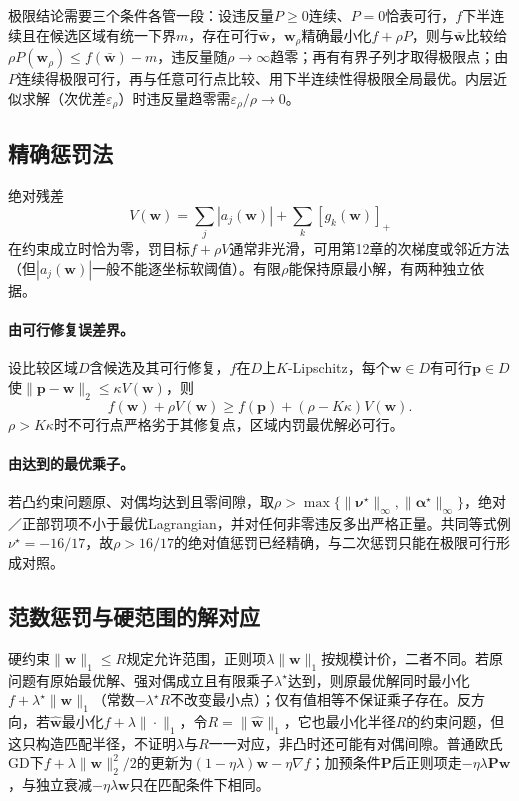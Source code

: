 极限结论需要三个条件各管一段：设违反量$P\geq0$连续、$P=0$恰表可行，$f$下半连续且在候选区域有统一下界$m$，存在可行$\bar{\bm w}$，$\bm w_\rho$精确最小化$f+\rho P$，则与$\bar{\bm w}$比较给$\rho P(\bm w_\rho)\leq f(\bar{\bm w})-m$，违反量随$\rho\to\infty$趋零；再有有界子列才取得极限点；由$P$连续得极限可行，再与任意可行点比较、用下半连续性得极限全局最优。内层近似求解（次优差$\varepsilon_\rho$）时违反量趋零需$\varepsilon_\rho/\rho\to0$。

\subsection{精确惩罚法}

绝对残差
\begin{equation}
 V(\bm w)=\sum_j|a_j(\bm w)|+\sum_k[g_k(\bm w)]_+
 \label{eq:opt-exact-penalty}
\end{equation}
在约束成立时恰为零，罚目标$f+\rho V$通常非光滑，可用第12章的次梯度或邻近方法（但$|a_j(\bm w)|$一般不能逐坐标软阈值）。有限$\rho$能保持原最小解，有两种独立依据。

\paragraph{由可行修复误差界。}
设比较区域$D$含候选及其可行修复，$f$在$D$上$K$-Lipschitz，每个$\bm w\in D$有可行$\bm p\in D$使$\|\bm p-\bm w\|_2\leq\kappa V(\bm w)$，则
\[
 f(\bm w)+\rho V(\bm w)
 \geq f(\bm p)+(\rho-K\kappa)V(\bm w).
\]
$\rho>K\kappa$时不可行点严格劣于其修复点，区域内罚最优解必可行。

\paragraph{由达到的最优乘子。}
若凸约束问题原、对偶均达到且零间隙，取$\rho>\max\{\|\bm\nu^\star\|_\infty,\|\bm\alpha^\star\|_\infty\}$，绝对／正部罚项不小于最优Lagrangian，并对任何非零违反多出严格正量。共同等式例$\nu^\star=-16/17$，故$\rho>16/17$的绝对值惩罚已经精确，与二次惩罚只能在极限可行形成对照。

\subsection{范数惩罚与硬范围的解对应}

硬约束$\|\bm w\|_1\leq R$规定允许范围，正则项$\lambda\|\bm w\|_1$按规模计价，二者不同。若原问题有原始最优解、强对偶成立且有限乘子$\lambda^\star$达到，则原最优解同时最小化$f+\lambda^\star\|\bm w\|_1$（常数$-\lambda^\star R$不改变最小点）；仅有值相等不保证乘子存在。反方向，若$\widehat{\bm w}$最小化$f+\lambda\|\cdot\|_1$，令$R=\|\widehat{\bm w}\|_1$，它也最小化半径$R$的约束问题，但这只构造匹配半径，不证明$\lambda$与$R$一一对应，非凸时还可能有对偶间隙。普通欧氏GD下$f+\lambda\|\bm w\|_2^2/2$的更新为$(1-\eta\lambda)\bm w-\eta\nabla f$；加预条件$\bm P$后正则项走$-\eta\lambda\bm P\bm w$，与独立衰减$-\eta\lambda\bm w$只在匹配条件下相同。

